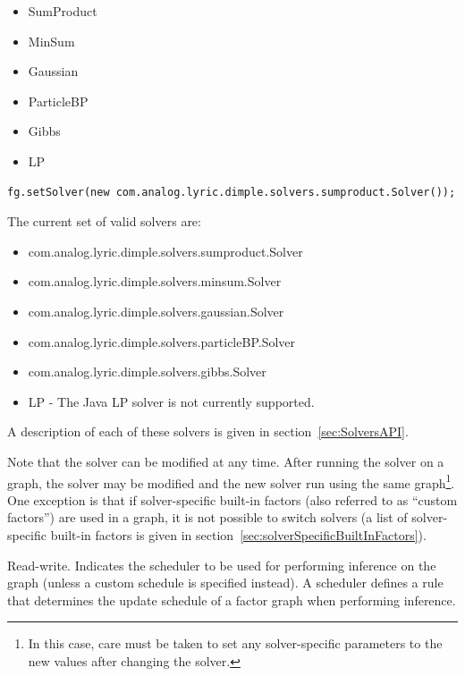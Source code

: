 \begin{itemize}
\item SumProduct
\item MinSum
\item Gaussian
\item ParticleBP
\item Gibbs
\item LP
\end{itemize}

\fi

\ifjava
\begin{lstlisting}
fg.setSolver(new com.analog.lyric.dimple.solvers.sumproduct.Solver());
\end{lstlisting}

The current set of valid solvers are:

\begin{itemize}
\item com.analog.lyric.dimple.solvers.sumproduct.Solver
\item com.analog.lyric.dimple.solvers.minsum.Solver
\item com.analog.lyric.dimple.solvers.gaussian.Solver
\item com.analog.lyric.dimple.solvers.particleBP.Solver
\item com.analog.lyric.dimple.solvers.gibbs.Solver
\item LP - The Java LP solver is not currently supported.
\end{itemize}

\fi


A description of each of these solvers is given in section~\ref{sec:SolversAPI}.

Note that the solver can be modified at any time.  After running the solver on a graph, the solver may be modified and the new solver run using the same graph\footnote{In this case, care must be taken to set any solver-specific parameters to the new values after changing the solver.}.  One exception is that if solver-specific built-in factors (also referred to as ``custom factors'') are used in a graph, it is not possible to switch solvers (a list of solver-specific built-in factors is given in section~\ref{sec:solverSpecificBuiltInFactors}).


\label{sec:FactorGraph.Scheduler}

Read-write.  Indicates the scheduler to be used for performing inference on the graph (unless a custom schedule is specified instead).  A scheduler defines a rule that determines the update schedule of a factor graph when performing inference.

